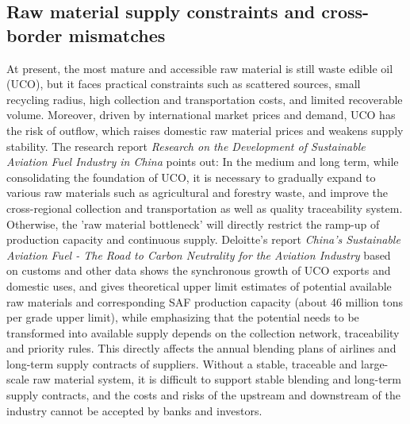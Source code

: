 \documentclass[a4paper,11pt]{article}
\begin{document}
\subsection{Raw material supply constraints and cross-border mismatches}
At present, the most mature and accessible raw material is still waste edible oil (UCO), but it faces practical constraints such as scattered sources, small recycling radius, high collection and transportation costs, and limited recoverable volume. Moreover, driven by international market prices and demand, UCO has the risk of outflow, which raises domestic raw material prices and weakens supply stability. The research report \textit{Research on the Development of Sustainable Aviation Fuel Industry in China} points out: In the medium and long term, while consolidating the foundation of UCO, it is necessary to gradually expand to various raw materials such as agricultural and forestry waste, and improve the cross-regional collection and transportation as well as quality traceability system. Otherwise, the 'raw material bottleneck' will directly restrict the ramp-up of production capacity and continuous supply. Deloitte's report \textit{China's Sustainable Aviation Fuel - The Road to Carbon Neutrality for the Aviation Industry} \cite{deloitte2023} based on customs and other data shows the synchronous growth of UCO exports and domestic uses, and gives theoretical upper limit estimates of potential available raw materials and corresponding SAF production capacity (about 46 million tons per grade upper limit), while emphasizing that the potential needs to be transformed into available supply depends on the collection network, traceability and priority rules. This directly affects the annual blending plans of airlines and long-term supply contracts of suppliers. Without a stable, traceable and large-scale raw material system, it is difficult to support stable blending and long-term supply contracts, and the costs and risks of the upstream and downstream of the industry cannot be accepted by banks and investors.
\end{document}
